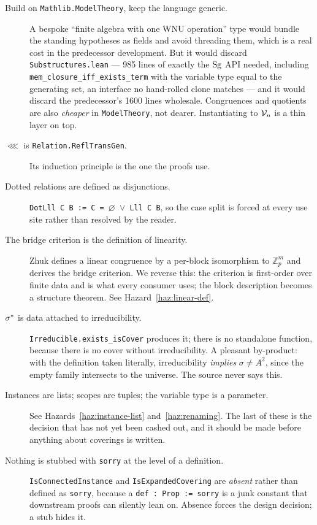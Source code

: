 \begin{description}
\item[Build on \texttt{Mathlib.ModelTheory}, keep the language generic.]
  A bespoke ``finite algebra with one WNU operation'' type would bundle the
  standing hypotheses as fields and avoid threading them, which is a real cost
  in the predecessor development. But it would discard
  \texttt{Substructures.lean} --- 985 lines of exactly the $\operatorname{Sg}$ API needed,
  including \texttt{mem\_closure\_iff\_exists\_term} with the variable type
  equal to the generating set, an interface no hand-rolled clone matches --- and
  it would discard the predecessor's 1600 lines wholesale. Congruences and
  quotients are also \emph{cheaper} in \texttt{ModelTheory}, not dearer.
  Instantiating to $\mathcal V_{n}$ is a thin layer on top.

\item[$\lll$ is \texttt{Relation.ReflTransGen}.]
  Its induction principle is the one the proofs use.

\item[Dotted relations are defined as disjunctions.]
  \texttt{DotLll C B := C = }$\varnothing$\texttt{ }$\vee$\texttt{ Lll C B}, so the case split is forced at every
  use site rather than resolved by the reader.

\item[The bridge criterion is the definition of linearity.]
  Zhuk defines a linear congruence by a per-block isomorphism to
  $\mathbb Z_{p}^{m}$ and derives the bridge criterion. We reverse this: the
  criterion is first-order over finite data and is what every consumer uses; the
  block description becomes a structure theorem. See
  Hazard~\ref{haz:linear-def}.

\item[$\sigma^{*}$ is data attached to irreducibility.]
  \texttt{Irreducible.exists\_isCover} produces it; there is no standalone
  function, because there is no cover without irreducibility. A pleasant
  by-product: with the definition taken literally, irreducibility \emph{implies}
  $\sigma\neq A^{2}$, since the empty family intersects to the universe. The
  source never says this.

\item[Instances are lists; scopes are tuples; the variable type is a parameter.]
  See Hazards~\ref{haz:instance-list} and~\ref{haz:renaming}. The last of these
  is the decision that has not yet been cashed out, and it should be made before
  anything about coverings is written.

\item[Nothing is stubbed with \texttt{sorry} at the level of a definition.]
  \texttt{IsConnectedInstance} and \texttt{IsExpandedCovering} are
  \emph{absent} rather than defined as \texttt{sorry}, because a
  \texttt{def~:~Prop~:=~sorry} is a junk constant that downstream proofs can
  silently lean on. Absence forces the design decision; a stub hides it.
\end{description}

